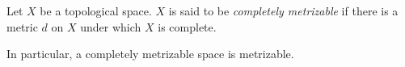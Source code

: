 \documentclass[12pt]{article}
\begin{document}
Let $X$ be a topological space.  $X$ is said to be \emph{completely metrizable} if there is a metric $d$ on $X$ under which $X$ is complete.

In particular, a completely metrizable space is metrizable.

\end{document}
